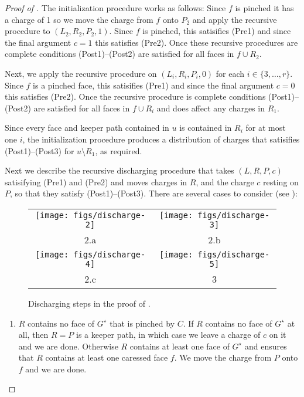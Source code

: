 \documentclass{patmorin}
\newcommand{\dual}[1]{{#1}^\star}
\begin{document}
\begin{proof}[Proof of ]
    The initialization procedure works as follows: Since $f$ is pinched it has a charge of 1 so we move the charge from $f$ onto $P_2$ and apply the recursive procedure to $(L_2,R_2,P_2,1)$.  Since $f$ is pinched, this satisifies (Pre1) and since the final argument $c=1$ this satisfies (Pre2).  Once these recursive procedures are complete conditions (Post1)--(Post2) are satisfied for all faces in $f\cup R_2$.

    Next, we apply the recursive procedure on $(L_i,R_i,P_i,0)$ for each $i\in\{3,\ldots,r\}$.  Since $f$ is a pinched face, this satisifies (Pre1) and since the final argument $c=0$ this satisfies (Pre2).  Once the recursive procedure is complete conditions (Post1)--(Post2) are satisfied for all faces in $f\cup R_i$ and does affect any charges in $R_1$.

    Since every face and keeper path contained in $u$ is contained in $R_i$ for at most one $i$, the initialization procedure produces a distribution of charges that satisifies (Post1)--(Post3) for $u\setminus R_1$, as required.

    Next we describe the recursive discharging procedure that takes $(L,R,P,c)$ satisifying (Pre1) and (Pre2) and moves charges in $R$, and the charge $c$ resting on $P$, so that they satisfy (Post1)--(Post3).  There are several cases to consider (see ):
	\begin{figure}
		\begin{center}
		\begin{tabular}{cc}
			\texttt{[image: figs/discharge-2]} &
			\texttt{[image: figs/discharge-3]} \\
			 2.a & 2.b \\[1.5em]
			\texttt{[image: figs/discharge-4]} &
			\texttt{[image: figs/discharge-5]} \\
			 2.c & 3
		\end{tabular}
		\end{center}
		\caption{Discharging steps in the proof of
		.}
	\end{figure}
  \begin{enumerate}
     \item $R$ contains no face of $\dual{G}$ that is pinched by $C$.
     If $R$ contains no face of $\dual{G}$ at all, then $R=P$ is a keeper path,
     in which case we leave a charge of $c$ on it and we are done.
     Otherwise $R$ contains at least one face of $\dual{G}$ and   ensures that $R$ contains at least one caressed face $f$.  We move the charge from $P$ onto $f$ and we are done.


\end{enumerate}
\end{proof}
\end{document}
